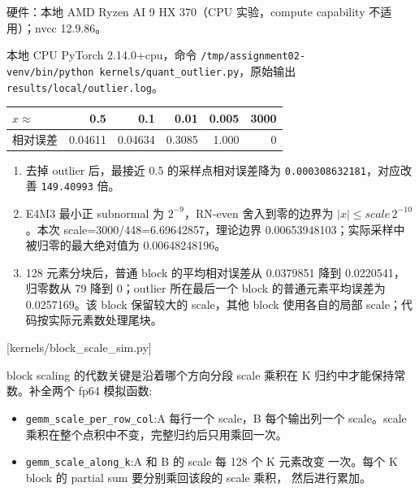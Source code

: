 \documentclass[11pt,a4paper,fontset=fandol]{ctexart}
\providecommand{\tightlist}{\setlength{\itemsep}{0pt}\setlength{\parskip}{0pt}}
\begin{document}
\begin{answer}

硬件：本地 AMD Ryzen AI 9 HX 370（CPU 实验，compute capability
不适用）；nvcc 12.9.86。

本地 CPU PyTorch 2.14.0+cpu，命令
\texttt{/\allowbreak{}tmp/\allowbreak{}assignment02-\allowbreak{}venv/\allowbreak{}bin/\allowbreak{}python\ kernels/\allowbreak{}quant\_\allowbreak{}outlier.\allowbreak{}py}，原始输出
\texttt{results/\allowbreak{}local/\allowbreak{}outlier.\allowbreak{}log}。

\begin{longtable}[]{@{}lrrrrr@{}}
\toprule\noalign{}
\(x\approx\) & 0.5 & 0.1 & 0.01 & 0.005 & 3000 \\
\midrule\noalign{}
\endhead
\bottomrule\noalign{}
\endlastfoot
相对误差 & 0.04611 & 0.04634 & 0.3085 & 1.000 & 0 \\
\end{longtable}

\begin{enumerate}
\def\labelenumi{(\alph{enumi})}
\item
  去掉 outlier 后，最接近 0.5 的采样点相对误差降为
  \texttt{0.\allowbreak{}000308632181}，对应改善
  \texttt{149.\allowbreak{}40993} 倍。
\item
  E4M3 最小正 subnormal 为 \(2^{-9}\)，RN-even 舍入到零的边界为
  \(|x|\le scale\,2^{-10}\)。本次 scale=3000/448=6.69642857，理论边界
  0.00653948103；实际采样中被归零的最大绝对值为 0.00648248196。
\item
  128 元素分块后，普通 block 的平均相对误差从 0.0379851 降到
  0.0220541，归零数从 79 降到 0；outlier 所在最后一个 block
  的普通元素平均误差为 0.0257169。该 block 保留较大的 scale，其他 block
  使用各自的局部 scale；代码按实际元素数处理尾块。
\end{enumerate}

\end{answer}

[kernels/block\_scale\_sim.py]

block scaling 的代数关键是沿着哪个方向分段 scale 乘积在 K
归约中才能保持常数。补全两个 fp64 模拟函数:

\begin{itemize}
\tightlist
\item
  \texttt{gemm\_\allowbreak{}scale\_\allowbreak{}per\_\allowbreak{}row\_\allowbreak{}col}:A
  每行一个 scale，B 每个输出列一个 scale。scale
  乘积在整个点积中不变，完整归约后只用乘回一次。
\item
  \texttt{gemm\_\allowbreak{}scale\_\allowbreak{}along\_\allowbreak{}k}:A
  和 B 的 scale 每 128 个 K 元素改变 一次。每个 K block 的 partial sum
  要分别乘回该段的 scale 乘积， 然后进行累加。
\end{itemize}
\end{document}
